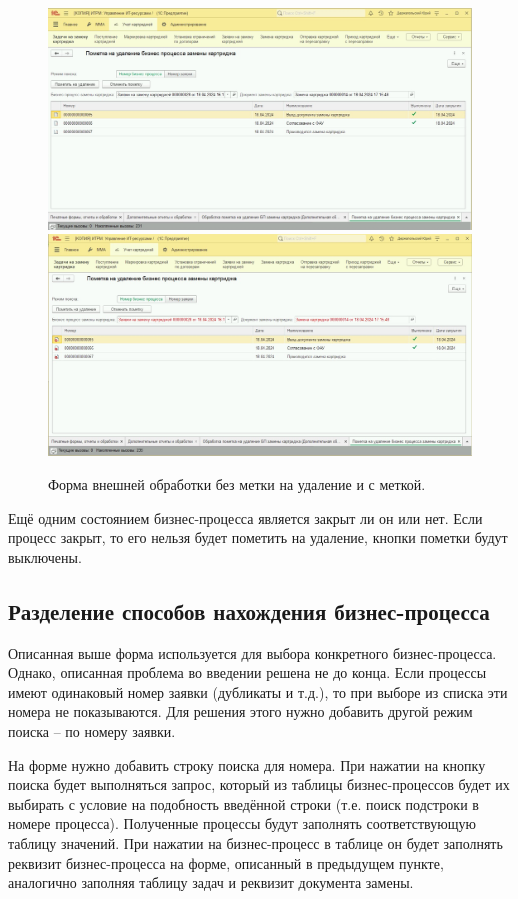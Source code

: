     \begin{figure}[H]
        \centering
        \includegraphics[width=13cm]{pictures/interf.png}
        \includegraphics[width=13cm]{pictures/interf_marked.png}
        \caption{Форма внешней обработки без метки на удаление и с меткой.}  \label{form}
    \end{figure}

    Ещё одним состоянием бизнес-процесса является закрыт ли он или нет. Если процесс закрыт, то его нельзя будет пометить на удаление, кнопки пометки будут выключены. 

    \subsection{Разделение способов нахождения бизнес-процесса}
    Описанная выше форма используется для выбора конкретного бизнес-процесса. Однако, описанная проблема во введении решена не до конца. Если процессы имеют одинаковый номер заявки (дубликаты и т.д.), то при выборе из списка эти номера не показываются. Для решения этого нужно добавить другой режим поиска -- по номеру заявки.

    На форме нужно добавить строку поиска для номера. При нажатии на кнопку поиска будет выполняться запрос, который из таблицы бизнес-процессов будет их выбирать с условие на подобность введённой строки (т.е. поиск подстроки в номере процесса). Полученные процессы будут заполнять соответствующую таблицу значений. При нажатии на бизнес-процесс в таблице он будет заполнять реквизит бизнес-процесса на форме, описанный в предыдущем пункте, аналогично заполняя таблицу задач и реквизит документа замены.

